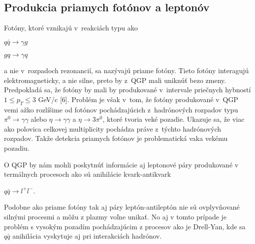 \subsection{Produkcia priamych fotónov a leptonóv}
Fotóny, ktoré vznikajú v~reakciách typu ako
\begin{center}
  $q \bar{q} \longrightarrow \gamma g$
\end{center}
\begin{center}
  $g q \longrightarrow \gamma q$
\end{center}
a nie v~rozpadoch rezonancií, sa nazývajú priame fotóny. Tieto
fotóny interagujú elektromagneticky, a nie silne, preto by z~QGP  mali
uniknúť bezo zmeny. Predpokladá sa, že fotóny by mali
by\softt{} produkované v~intervale priečnych hybností $1 \leq
p_{T} \leq 3$ GeV/c [6]. Problém je však  v~tom, že fotóny
produkované v~QGP ve\softl{}mi \softt{}ažko rozlíšime od
fotónov  pochádzajúcich z~hadrónových rozpadov typu $ \pi^{0}
\longrightarrow \gamma \gamma $ alebo $ \eta \longrightarrow \gamma \gamma$ a
$\eta \longrightarrow 3\pi^{0}$, ktoré tvoria ve\softl{}ké pozadie.
Ukazuje sa, že viac ako polovica celkovej multiplicity pochádza práve
z~týchto hadrónových rozpadov. Takže detekcia priamych fotónov je
problematická v\softd{}aka ve\softl{}kému pozadiu.

O QGP by nám mohli poskytnúť informácie aj  leptonové páry
produkované v termálnych procesoch ako sú anihilácie kvark-antikvark
\begin{center}
  $q\bar{q} \longrightarrow l^{+}l^{-}$.
\end{center}
Podobne ako priame fotóny tak aj páry leptón-antileptón nie sú ovplyvňované
silnými procesmi a môžu z plazmy voľne unikať. No aj v tomto prípade je
problém s vysokým pozadím pochádzajúcim z procesov ako je Drell-Yan, kde sa
$q\bar{q}$ anihilácia  vyskytuje aj pri interakciách hadrónov.



